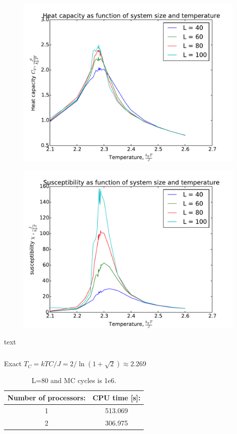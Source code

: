 \begin{figure}[H]
	\centering
	\includegraphics[width=0.7\linewidth]{../results/4e/4e_Cv}
	\caption{}
	\label{fig:4ecv}
\end{figure}

\begin{figure}[H]
	\centering
	\includegraphics[width=0.7\linewidth]{../results/4e/4e_x}
	\caption{}
	\label{fig:4ex}
\end{figure}


\begin{table}[H]
	\caption{text}
	\label{tab: T_C}
	\begin{tabular}{cccccc}
		
	\end{tabular}
\end{table}




Exact $T_C =  kTC/J = 2/ \ln(1+\sqrt{
	2}) \approx 2.269$ \cite{Onsager}

\begin{table}\caption{L=80 and MC cycles is 1e6.}
	\begin{tabular}{cc}
		Number of processors:& CPU time [s]: \\ \hline
		1 & 513.069\\
		2 & 306.975\\
	\end{tabular}
\end{table}
